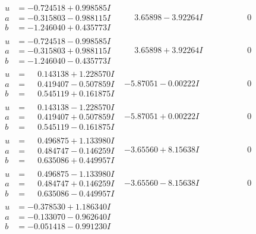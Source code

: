 \documentclass[1p]{elsarticle_modified}
\theoremstyle{definition}
\begin{document}
$$\begin{array}{c|c|c}
\begin{aligned}
u &= -0.724518 + 0.998585 I \\
a &= -0.315803 - 0.988115 I \\
b &= -1.246040 + 0.435773 I\end{aligned}
 & \phantom{-}3.65898 - 3.92264 I & \phantom{-0.000000 } 0 \\ \hline\begin{aligned}
u &= -0.724518 - 0.998585 I \\
a &= -0.315803 + 0.988115 I \\
b &= -1.246040 - 0.435773 I\end{aligned}
 & \phantom{-}3.65898 + 3.92264 I & \phantom{-0.000000 } 0 \\ \hline\begin{aligned}
u &= \phantom{-}0.143138 + 1.228570 I \\
a &= \phantom{-}0.419407 - 0.507859 I \\
b &= \phantom{-}0.545119 + 0.161875 I\end{aligned}
 & -5.87051 - 0.00222 I & \phantom{-0.000000 } 0 \\ \hline\begin{aligned}
u &= \phantom{-}0.143138 - 1.228570 I \\
a &= \phantom{-}0.419407 + 0.507859 I \\
b &= \phantom{-}0.545119 - 0.161875 I\end{aligned}
 & -5.87051 + 0.00222 I & \phantom{-0.000000 } 0 \\ \hline\begin{aligned}
u &= \phantom{-}0.496875 + 1.133980 I \\
a &= \phantom{-}0.484747 - 0.146259 I \\
b &= \phantom{-}0.635086 + 0.449957 I\end{aligned}
 & -3.65560 + 8.15638 I & \phantom{-0.000000 } 0 \\ \hline\begin{aligned}
u &= \phantom{-}0.496875 - 1.133980 I \\
a &= \phantom{-}0.484747 + 0.146259 I \\
b &= \phantom{-}0.635086 - 0.449957 I\end{aligned}
 & -3.65560 - 8.15638 I & \phantom{-0.000000 } 0 \\ \hline\begin{aligned}
u &= -0.378530 + 1.186340 I \\
a &= -0.133070 - 0.962640 I \\
b &= -0.051418 - 0.991230 I\end{aligned}

\end{array}$$
\end{document}
